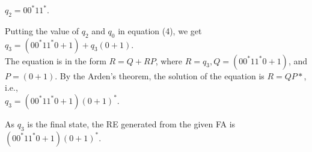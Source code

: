 \documentclass[9pt]{beamer}
\begin{document}
\begin{frame}
\hspace*{4.5cm} $q_2 = 00^*11^*$.\\
 \vspace*{0.1cm}

 \hspace*{0.5cm} Putting the value of $q_2$ and $q_0$ in equation (4), we get\\

 \vspace*{0.1cm}
\hspace*{3cm} $q_3 = (00^*11^*0 + 1) + q_3 (0 + 1)$.\\

 \vspace*{0.1cm}
The equation is in the form $R = Q + RP$, where $R = q_3, Q = (00^*11^*0 + 1)$, and $P = (0 + 1)$. By the
Arden’s theorem, the solution of the equation is $R = QP*$, i.e.,\\

 \vspace*{0.1cm}
\hspace*{3.2cm} $q_3 = (00^*11^*0 + 1) (0 + 1)^*$.\\
 \vspace*{0.1cm}

 \hspace*{0.5cm} As $q_3$ is the final state, the RE generated from the given FA is $(00^*11^*0 + 1) (0 + 1)^*$.\\
\end{frame}
\end{document}
